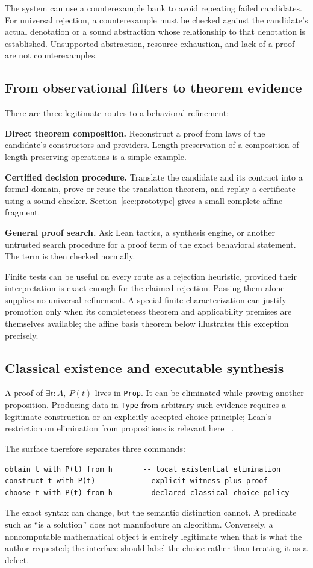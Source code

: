 \documentclass[11pt,letterpaper]{article}
\newcommand{\code}[1]{\nolinkurl{#1}}
\theoremstyle{definition}
\theoremstyle{remark}
\begin{document}
The system can use a counterexample bank to avoid repeating failed candidates.
For universal rejection, a counterexample must be checked against the candidate's
actual denotation or a sound abstraction whose relationship to that denotation
is established. Unsupported abstraction, resource exhaustion, and lack of a
proof are not counterexamples.

\subsection{From observational filters to theorem evidence}
There are three legitimate routes to a behavioral refinement:

\textbf{Direct theorem composition.} Reconstruct a proof from laws of the
candidate's constructors and providers. Length preservation of a composition of
length-preserving operations is a simple example.

\textbf{Certified decision procedure.} Translate the candidate and its contract
into a formal domain, prove or reuse the translation theorem, and replay a
certificate using a sound checker. Section~\ref{sec:prototype} gives a small
complete affine fragment.

\textbf{General proof search.} Ask Lean tactics, a synthesis engine, or another
untrusted search procedure for a proof term of the exact behavioral statement.
The term is then checked normally.

Finite tests can be useful on every route as a rejection heuristic, provided
their interpretation is exact enough for the claimed rejection. Passing them
alone supplies no universal refinement. A special finite characterization can
justify promotion only when its completeness theorem and applicability premises
are themselves available; the affine basis theorem below illustrates this
exception precisely.

\subsection{Classical existence and executable synthesis}
A proof of $\exists t:A,\ P(t)$ lives in \code{Prop}. It can be eliminated while
proving another proposition. Producing data in \code{Type} from arbitrary such
evidence requires a legitimate construction or an explicitly accepted choice
principle; Lean's restriction on elimination from propositions is relevant here
~\cite{LeanProps}.

The surface therefore separates three commands:
\begin{lstlisting}
obtain t with P(t) from h       -- local existential elimination
construct t with P(t)          -- explicit witness plus proof
choose t with P(t) from h      -- declared classical choice policy
\end{lstlisting}
The exact syntax can change, but the semantic distinction cannot. A predicate
such as ``is a solution'' does not manufacture an algorithm. Conversely, a
noncomputable mathematical object is entirely legitimate when that is what the
author requested; the interface should label the choice rather than treating it
as a defect.
\end{document}

